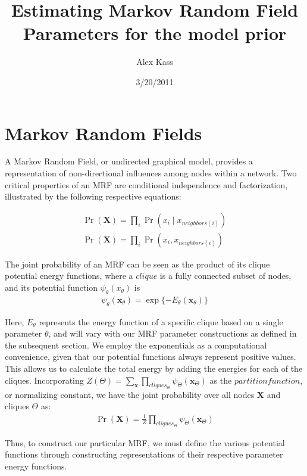 \documentclass{article}
\title{Estimating Markov Random Field Parameters for the model prior}
\author{Alex Kass}
\date{3/20/2011}
\begin{document}
\section{Markov Random Fields}
%

A Markov Random Field, or undirected graphical model, provides a representation of non-directional influences among nodes within a network.  Two critical properties of an MRF are conditional independence and factorization, illustrated by the following respective equations:

\begin{eqnarray*}
\Pr(\mathbf{X}) = \prod_i{\Pr(x_i \mid x_{neighbors(i)})}\\
\Pr(\mathbf{X}) = \prod_i{\Pr(x_i, x_{neighbors(i)})}
\end{eqnarray*}

The joint probability of an MRF can be seen as the product of its clique potential energy functions, where a $clique$ is a fully connected subset of nodes, and its potential function $\psi_\theta(x_\theta)$ is 
\begin{eqnarray*}
\psi_\theta(\mathbf{x}_\theta) = \exp\{-E_\theta(\mathbf{x}_\theta)\}
\end{eqnarray*}

Here, $E_\theta$ represents the energy function of a specific clique based on a single parameter $\theta$, and will vary with our MRF parameter constructions as defined in the subsequent section.  We employ the exponentials as a computational convenience, given that our potential functions always represent positive values.  This allows us to calculate the total energy by adding the energies for each of the cliques.  Incorporating $Z(\Theta) = \sum_{\mathbf{x}}\prod_{cliques_\Theta}{\psi_\Theta(\mathbf{x}_\Theta)}$ as the $partition function$, or normalizing constant, we have the joint probability over all nodes $\mathbf{X}$ and cliques $\Theta$ as:
\begin{eqnarray*}
\Pr(\mathbf{X}) = \frac{1}{Z}\prod_{cliques_\Theta}{\psi_\Theta(\mathbf{x}_\Theta)}
\end{eqnarray*}

Thus, to construct our particular MRF, we must define the various potential functions through constructing representations of their respective parameter energy functions.
\end{document}
